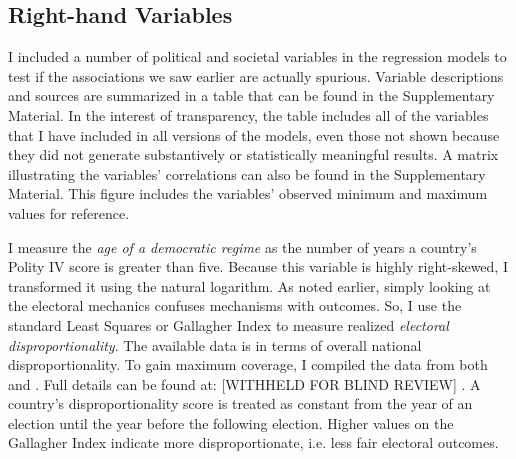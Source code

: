 \documentclass[a4paper]{article}\usepackage[]{graphicx}\usepackage[]{color}
\begin{document}
\subsection*{Right-hand Variables}

I included a number of political and societal variables in the regression models to test if the associations we saw earlier are actually spurious. Variable descriptions and sources are summarized in a table that can be found in the Supplementary Material. In the interest of transparency, the table includes all of the variables that I have included in all versions of the models, even those not shown because they did not generate substantively or statistically meaningful results. A matrix illustrating the variables' correlations can also be found in the Supplementary Material. This figure includes the variables' observed minimum and maximum values for reference.

I measure the {\emph{age of a democratic regime}} as the number of years a country's Polity IV score \citep{Marshall2009} is greater than five. Because this variable is highly right-skewed, I transformed it using the natural logarithm. As noted earlier, simply looking at the electoral mechanics confuses mechanisms with outcomes. So, I use the standard Least Squares or Gallagher Index \citep{Gallagher1991} to measure realized {\emph{electoral disproportionality}}. The available data is in terms of overall national disproportionality. To gain maximum coverage, I compiled the data from both \cite{Gallagher2012} and \cite{Carey2011}. Full details can be found at: [WITHHELD FOR BLIND REVIEW]
.
A country's disproportionality score is treated as constant from the year of an election until the year before the following election. Higher values on the Gallagher Index indicate more disproportionate, i.e. less fair electoral outcomes.
\end{document}
